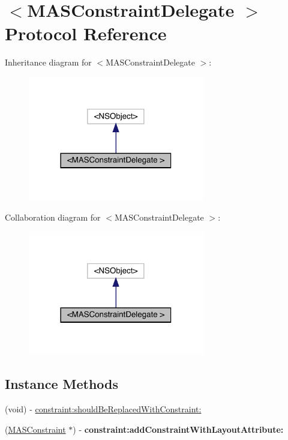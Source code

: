 \hypertarget{protocol_m_a_s_constraint_delegate_01-p}{}\section{$<$M\+A\+S\+Constraint\+Delegate $>$ Protocol Reference}
\label{protocol_m_a_s_constraint_delegate_01-p}


Inheritance diagram for $<$M\+A\+S\+Constraint\+Delegate $>$\+:\nopagebreak
\begin{figure}[H]
\begin{center}
\leavevmode
\includegraphics[width=218pt]{protocol_m_a_s_constraint_delegate_01-p__inherit__graph}
\end{center}
\end{figure}


Collaboration diagram for $<$M\+A\+S\+Constraint\+Delegate $>$\+:\nopagebreak
\begin{figure}[H]
\begin{center}
\leavevmode
\includegraphics[width=218pt]{protocol_m_a_s_constraint_delegate_01-p__coll__graph}
\end{center}
\end{figure}
\subsection*{Instance Methods}
\begin{DoxyCompactItemize}
\item 
(void) -\/ \mbox{\hyperlink{protocol_m_a_s_constraint_delegate_01-p_a39a785b8c164b33e76bafcf4c5c4d36d}{constraint\+:should\+Be\+Replaced\+With\+Constraint\+:}}
\item 
\mbox{\label{protocol_m_a_s_constraint_delegate_01-p_a7b80864b91d179a480ccf39b1b7c9eaf}} 
(\mbox{\hyperlink{interface_m_a_s_constraint}{M\+A\+S\+Constraint}} $\ast$) -\/ {\bfseries constraint\+:add\+Constraint\+With\+Layout\+Attribute\+:}
\end{DoxyCompactItemize}


